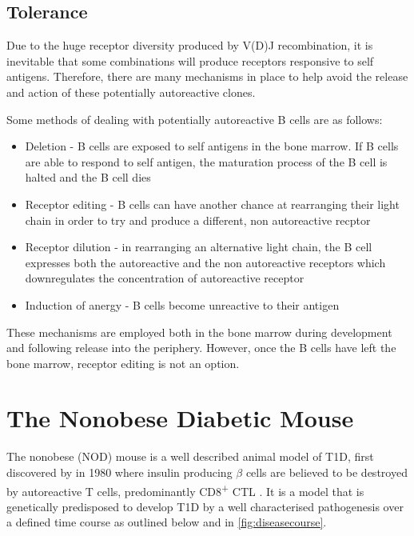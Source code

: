 \subsection{Tolerance}

Due to the huge receptor diversity produced by V(D)J recombination, it is inevitable that some combinations will produce receptors responsive to self antigens.
Therefore, there are many mechanisms in place to help avoid the release and action of these potentially autoreactive clones.

Some methods of dealing with potentially autoreactive B cells are as follows:
\begin{itemize}
\item Deletion - B cells are exposed to self antigens in the bone marrow. If B cells are able to respond to self antigen, the maturation process of the B cell is halted and the B cell dies \citep{Cornall1995}
\item Receptor editing - B cells can have another chance at rearranging their light chain in order to try and produce a different, non autoreactive recptor \citep{Orduno2009, Gay1993}
\item Receptor dilution - in rearranging an alternative light chain, the B cell expresses both the autoreactive and the non autoreactive receptors which downregulates the concentration of autoreactive receptor \citep{Gay1993, Orduno2009}
\item Induction of anergy - B cells become unreactive to their antigen \citep{Orduno2009}
\end{itemize}

These mechanisms are employed both in the bone marrow during development and following release into the periphery.
However, once the B cells have left the bone marrow, receptor editing is not an option.



\section{The Nonobese Diabetic Mouse}

The nonobese (NOD) mouse is a well described animal model of T1D, first discovered by \citet{Makino1980} in 1980 where insulin producing $\beta$ cells are believed to be destroyed by autoreactive T cells, predominantly CD8\textsuperscript{+} CTL \citep{Lieberman2003}.
It is a model that is genetically predisposed to develop T1D by a well characterised pathogenesis over a defined time course as outlined below and in \cref{fig:diseasecourse}.

